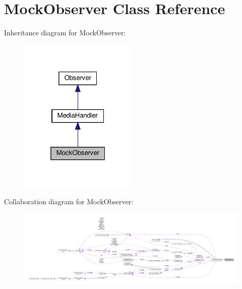 \hypertarget{classMockObserver}{}\section{Mock\+Observer Class Reference}
\label{classMockObserver}


Inheritance diagram for Mock\+Observer\+:\nopagebreak
\begin{figure}[H]
\begin{center}
\leavevmode
\includegraphics[width=160pt]{classMockObserver__inherit__graph}
\end{center}
\end{figure}


Collaboration diagram for Mock\+Observer\+:\nopagebreak
\begin{figure}[H]
\begin{center}
\leavevmode
\includegraphics[width=350pt]{classMockObserver__coll__graph}
\end{center}
\end{figure}
